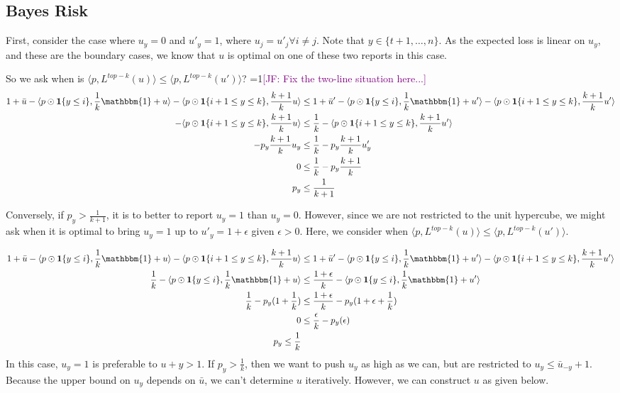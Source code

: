 \documentclass[12pt]{article}
\newcommand{\Comments}{1}
\newcommand{\mynote}[2]{\ifnum\Comments=1\textcolor{#1}{#2}\fi}
\newcommand{\jessie}[1]{\mynote{purple}{[JF: #1]}}
\newcommand{\ubar}{\bar{u}}
\newcommand{\inprod}[2]{\langle #1, #2 \rangle}%
\newcommand{\ones}{\mathbbm{1}}
\newcommand{\Ind}[1]{\mathbf{1}\{#1\}}
\begin{document}
\subsection{Bayes Risk}
First, consider the case where $u_y = 0$ and $u'_y = 1$, where $u_j = u'_j \forall i \neq j$.
Note that $y \in \{t+1, \ldots, n\}$.
As the expected loss is linear on $u_y$, and these are the boundary cases, we know that $u$ is optimal on one of these two reports in this case.

So we ask when is $\inprod{p}{L^{top-k}(u)} \leq \inprod{p}{L^{top-k}(u')}$?
\jessie{Fix the two-line situation here...}
\begin{align*}
1 + \ubar - \inprod{p \odot \Ind{y \leq i}}{\frac 1 k \ones + u} - \inprod{p \odot \Ind{i+1 \leq y \leq k}}{ \frac {k+1} k u} &\leq 1 + \ubar' - \inprod{p \odot \Ind{y \leq i}}{\frac 1 k \ones + u'} - \inprod{p \odot \Ind{i+1 \leq y \leq k}}{ \frac {k+1} k u'}\\
- \inprod{p \odot \Ind{i+1 \leq y \leq k}}{ \frac {k+1} k u} &\leq \frac{1}{k} - \inprod{p \odot \Ind{i+1 \leq y \leq k}}{ \frac {k+1} k u'}\\
-p_y \frac{k+1}{k} u_y &\leq \frac{1}{k} - p_y \frac{k+1}{k} u'_y \\
0 &\leq \frac{1}{k} - p_y \frac{k+1}{k}\\
p_y &\leq \frac{1}{k+1}
\end{align*}

Conversely, if $p_y > \frac{1}{k+1}$, it is to better to report $u_y = 1$ than $u_y = 0$.
However, since we are not restricted to the unit hypercube, we might ask when it is optimal to bring $u_y = 1$ up to $u'_y = 1 + \epsilon$ given $\epsilon > 0$.
Here, we consider when $\inprod{p}{L^{top-k}(u)} \leq \inprod{p}{L^{top-k}(u')}$.

\begin{align*}
1 + \ubar - \inprod{p \odot \Ind{y \leq i}}{\frac 1 k \ones + u} - \inprod{p \odot \Ind{i+1 \leq y \leq k}}{ \frac {k+1} k u} &\leq 1 + \ubar' - \inprod{p \odot \Ind{y \leq i}}{\frac 1 k \ones + u'} - \inprod{p \odot \Ind{i+1 \leq y \leq k}}{ \frac {k+1} k u'}\\
\frac{1}{k}- \inprod{p \odot \Ind{y \leq i}}{\frac 1 k \ones + u} &\leq \frac{1+\epsilon}{k} - \inprod{p \odot \Ind{y \leq i}}{\frac 1 k \ones + u'}\\
\frac{1}{k}- p_y(1 + \frac{1}{k}) &\leq \frac{1+\epsilon}{k} - p_y(1 + \epsilon + \frac{1}{k})\\
0 &\leq \frac{\epsilon}{k} - p_y(\epsilon)\\
p_y \leq \frac 1 k
\end{align*}
In this case, $u_y=1$ is preferable to $u+y >1$.
If $p_y > \frac 1 k$, then we want to push $u_y$ as high as we can, but are restricted to $u_y \leq \ubar_{-y} + 1$.
Because the upper bound on $u_y$ depends on $\ubar$, we can't determine $u$ iteratively.
However, we can construct $u$ as given below.
\end{document}

